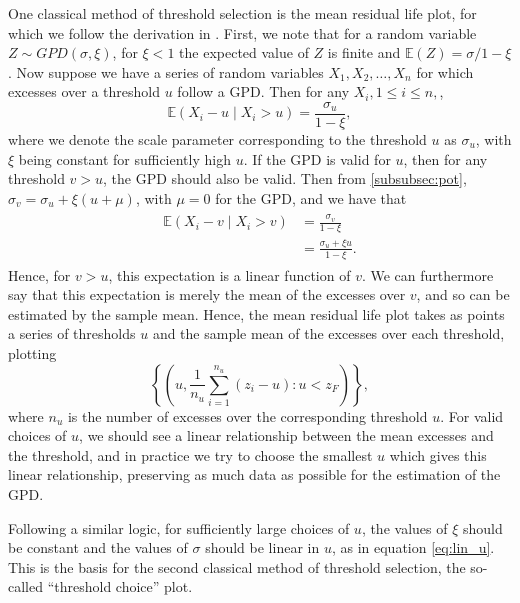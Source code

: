\documentclass{article}
\numberwithin{equation}{section}
\begin{document}
One classical method of threshold selection is the mean residual life plot, for which we follow the derivation in \cite{Coles2001}.  
First, we note that for a random variable $Z \sim GPD(\sigma, \xi)$, for $\xi < 1$ the expected value of $Z$ is finite and $\mathbb{E}(Z) = \sigma/1 - \xi$.
Now suppose we have a series of random variables $X_1, X_2, \ldots, X_n$ for which excesses over a threshold $u$ follow a GPD. 
Then for any $X_i, 1 \le i \le n,$, 
\[
  \mathbb{E}(X_i - u \mid X_i > u) = \frac{\sigma_u}{1 - \xi},
\]
where we denote the scale parameter corresponding to the threshold $u$ as $\sigma_u$, with $\xi$ being constant for sufficiently high $u$. 
If the GPD is valid for $u$, then for any threshold $v > u$, the GPD should also be valid.
Then from \ref{subsubsec:pot}, $\sigma_v = \sigma_u + \xi(u + \mu)$, with $\mu = 0$ for the GPD, and we have that 
\begin{align} \label{eq:lin_u}
  \begin{split}
  \mathbb{E}(X_i - v \mid X_i > v) &= \frac{\sigma_v}{1 - \xi} \\
                                   &= \frac{\sigma_u + \xi u}{1-\xi}.
  \end{split}
\end{align}
Hence, for $v > u$, this expectation is a linear function of $v$. 
We can furthermore say that this expectation is merely the mean of the excesses over $v$, and so can be estimated by the sample mean. 
Hence, the mean residual life plot takes as points a series of thresholds $u$ and the sample mean of the excesses over each threshold, plotting
\[
  \left\{\left( u, \frac{1}{n_u} \sum_{i=1}^{n_u}{\left(z_i - u\right)}: u < z_{F} \right) \right\},
\]
where $n_u$ is the number of excesses over the corresponding threshold $u$.
For valid choices of $u$, we should see a linear relationship between the mean excesses and the threshold, and in practice we try to choose the smallest $u$ which gives this linear relationship, preserving as much data as possible for the estimation of the GPD.

Following a similar logic, for sufficiently large choices of $u$, the values of $\xi$ should be constant and the values of $\sigma$ should be linear in $u$, as in equation \ref{eq:lin_u}.
This is the basis for the second classical method of threshold selection, the so-called ``threshold choice'' plot.
\end{document}
